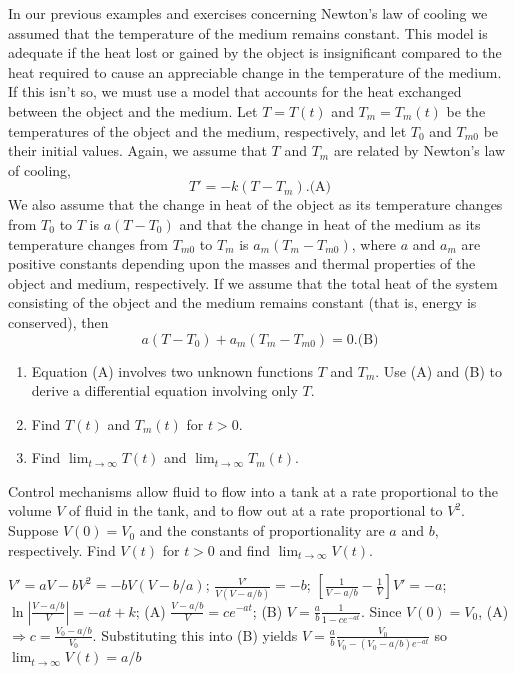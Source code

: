 \documentclass{ximera}
\begin{document}
\begin{problem}\label{exer:4.2.17}  %
In  our previous examples and exercises concerning Newton's law of cooling
we assumed that
the temperature of the medium remains constant.  This model is adequate
if the heat lost or gained by the object is
insignificant compared to the heat required to cause an appreciable change
in the temperature of the medium. If this isn't  so,  we
must use a model that accounts for the heat exchanged between the object
and the medium. Let $T=T(t)$ and $T_m=T_m(t)$  be the temperatures of the
object and the medium, respectively, and let $T_0$  and $T_{m0}$ be
their
initial values.  Again, we assume that $T$  and $T_m$ are related by
Newton's law of cooling,
$$
T'=-k(T-T_m).
\text{(A)}
$$
We also assume that the change in heat of the object as its
temperature changes from $T_0$ to $T$  is $a(T-T_0)$
and that the change in heat of the medium  as its
temperature changes from $T_{m0}$ to $T_m$  is $a_m(T_m-T_{m0})$,
where $a$
and $a_m$ are positive constants  depending  upon the masses and
thermal properties of the
object and medium, respectively.  If we assume that the total heat of
the system consisting of the object and the medium remains constant
(that is, energy is conserved), then
$$
a(T-T_0)+a_m(T_m-T_{m0})=0.
\text{(B)}
$$

\begin{enumerate}
\item %
Equation (A) involves  two unknown functions $T$ and $T_m$.
 Use (A) and (B) to derive a
differential equation involving only $T$.
\item %
Find $T(t)$ and $T_m(t)$ for $t>0$.
\item %
Find $\lim_{t\to\infty}T(t)$ and
 $\lim_{t\to\infty}T_m(t)$.
\end{enumerate}
\end{problem}

\begin{problem}\label{exer:4.2.18}Control mechanisms allow fluid to flow into a tank
at a rate proportional to the volume $V$ of fluid in the tank, and to
flow
out at a rate proportional to $V^2$. Suppose $V(0)=V_0$ and the
constants of proportionality are $a$ and $b$, respectively.
Find $V(t)$  for $t>0$ and find $\lim_{t\to\infty}V(t)$.

\begin{solution}
$V'=aV-bV^2=-bV(V-b/a)$; $\frac{V'}{V(V-a/b)}=-b$;
$\left[\frac{1}{V-a/b}-\frac{1}{V}\right]V'=-a$;
$\ln\left|\frac{V-a/b}{V}\right|=-at+k$; (A) $\frac{V-a/b}{V}=ce^{-at}$; (B) $V=\frac{a}{b}\frac{1}{1-ce^{-at}}$. Since
$V(0)=V_0$,  (A) $\Rightarrow c=\frac{V_0-a/b}{V_0}$. Substituting
this into (B) yields
$V=\frac{a}{b}\frac{V_0}{V_0-\left(V_0-a/b
\right)e^{-at}}$ so $\lim_{t\to\infty}V(t)=a/b$
\end{solution}
\end{problem}
\end{document}
